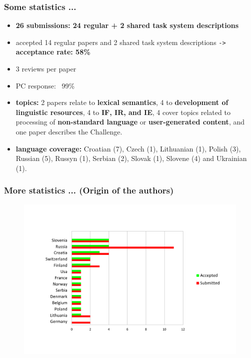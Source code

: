 \documentclass{beamer}
\begin{document}
\begin{frame}[fragile]
 \frametitle{Some statistics ...}

\begin{itemize}

\item \textbf{26 submissions: 24 regular + 2 shared task system descriptions}

\item accepted 14 regular papers and 2 shared task system descriptions \verb+->+  \textbf{acceptance rate: 58\%}

\item 3 reviews per paper

\item PC response: ~99\%

\item \textbf{topics:} 2 papers relate to \textbf{lexical semantics}, 4 to \textbf{development of
linguistic resources}, 4 to \textbf{IF, IR, and IE}, 4 cover topics related to processing of \textbf{non-standard language} 
or \textbf{user-generated content}, and one paper describes the Challenge.

\item \textbf{language coverage:} Croatian (7), Czech (1), Lithuanian (1), Polish (3), Russian (5), Russyn (1), Serbian (2), Slovak (1), Slovene (4) and Ukrainian (1).

\end{itemize}

\end{frame}

\begin{frame}[fragile]
 \frametitle{More statistics ... (Origin of the authors)}

\begin{figure}[h!]
    \centering\leavevmode
    \hspace{1cm}
    \includegraphics[scale=0.38]{stats.pdf}
\end{figure} %

\end{frame}
\end{document}
